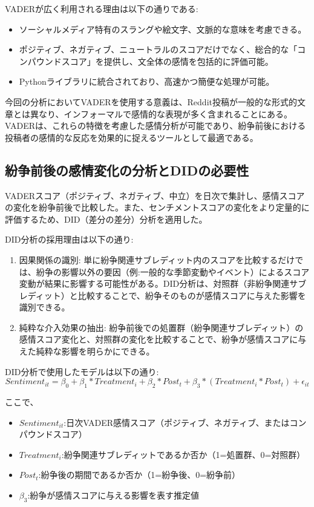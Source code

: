 \documentclass[11pt, a4j]{jreport}
\begin{document}
    VADERが広く利用される理由は以下の通りである:
    \begin{itemize}
        \item ソーシャルメディア特有のスラングや絵文字、文脈的な意味を考慮できる。
        \item ポジティブ、ネガティブ、ニュートラルのスコアだけでなく、総合的な「コンパウンドスコア」を提供し、文全体の感情を包括的に評価可能。
        \item Pythonライブラリに統合されており、高速かつ簡便な処理が可能。
    \end{itemize}

    今回の分析においてVADERを使用する意義は、Reddit投稿が一般的な形式的文章とは異なり、インフォーマルで感情的な表現が多く含まれることにある。VADERは、これらの特徴を考慮した感情分析が可能であり、紛争前後における投稿者の感情的な反応を効果的に捉えるツールとして最適である。

    \subsection*{紛争前後の感情変化の分析とDIDの必要性}
    VADERスコア（ポジティブ、ネガティブ、中立）を日次で集計し、感情スコアの変化を紛争前後で比較した。また、センチメントスコアの変化をより定量的に評価するため、DID（差分の差分）分析を適用した。

    DID分析の採用理由は以下の通り:
    \begin{enumerate}
        \item 因果関係の識別:
            単に紛争関連サブレディット内のスコアを比較するだけでは、紛争の影響以外の要因（例:一般的な季節変動やイベント）によるスコア変動が結果に影響する可能性がある。DID分析は、対照群（非紛争関連サブレディット）と比較することで、紛争そのものが感情スコアに与えた影響を識別できる。
        \item 純粋な介入効果の抽出:
            紛争前後での処置群（紛争関連サブレディット）の感情スコア変化と、対照群の変化を比較することで、紛争が感情スコアに与えた純粋な影響を明らかにできる。
    \end{enumerate}

    DID分析で使用したモデルは以下の通り:
    \begin{equation}
        Sentiment_{it} = \beta_{0} + \beta_{1}*Treatment_{i} + \beta_{2}*Post_{t} + \beta_{3}*(Treatment_{i} * Post_{t}) + \epsilon_{it}
    \end{equation}

    ここで、
    \begin{itemize}
        \item $Sentiment_{it}$:日次VADER感情スコア（ポジティブ、ネガティブ、またはコンパウンドスコア）
        \item $Treatment_{i}$:紛争関連サブレディットであるか否か（1=処置群、0=対照群）
        \item $Post_{t}$:紛争後の期間であるか否か（1=紛争後、0=紛争前）
        \item $\beta_{3}$:紛争が感情スコアに与える影響を表す推定値
    \end{itemize}
\end{document}
